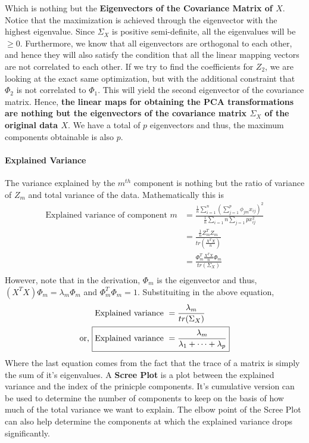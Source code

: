 \documentclass[../statistical_learning_notes.tex]{subfiles}
\begin{document}
    Which is nothing but the \textbf{Eigenvectors of the Covariance Matrix of $X$}. Notice that the maximization is achieved through the eigenvector with the highest eigenvalue. Since $\Sigma_{X}$ is positive semi-definite, all the eigenvalues will be $\geq 0$. \newline
    Furthermore, we know that all eigenvectors are orthogonal to each other, and hence they will also satisfy the condition that all the linear mapping vectors are not correlated to each other. \newline
    If we try to find the coefficients for $Z_{2}$, we are looking at the exact same optimization, but with the additional constraint that $\Phi_{2}$ is not correlated to $\Phi_{1}$. This will yield the second eigenvector of the covariance matrix. \newline
    Hence, \textbf{the linear maps for obtaining the PCA transformations are nothing but the eigenvectors of the covariance matrix $\Sigma_{X}$ of the original data $X$}. We have a total of $p$ eigenvectors and thus, the maximum components obtainable is also $p$.

    \paragraph{Explained Variance}
    The variance explained by the $m^{th}$ component is nothing but the ratio of variance of $Z_{m}$ and total variance of the data. Mathematically this is
    \begin{align*}
        \text{Explained variance of component } m &= \frac{\frac{1}{n}\sum_{i=1}^{n} (\sum_{j=1}^{p} \phi_{jm} x_{ij})^{2}}{\frac{1}{n}\sum_{i=1}{n} \sum_{j=1}{p} x_{ij}^2}\\
                &= \frac{\frac{1}{n}Z_{m}^{T}Z_{m}}{tr(\frac{X^{T}X}{n})}\\
                &= \frac{\Phi_{m}^{T}\frac{X^{T}X}{n}\Phi_{m}}{tr(\Sigma_{X})}\\
    \end{align*}
    However, note that in the derivation, $\Phi_{m}$ is the eigenvector and thus, $(X^{T}X)\Phi_{m} = \lambda_{m}\Phi_{m}$ and $\Phi_{m}^{T}\Phi_{m} = 1$. Substituiting in the above equation,
    \begin{align*}
        \text{Explained variance } &= \frac{\lambda_{m}}{tr(\Sigma_{X})}\\
        \text{or, } \Aboxed{\text{Explained variance } &= \frac{\lambda_{m}}{\lambda_{1} + \cdots +\lambda_{p}}}
    \end{align*}
    Where the last equation comes from the fact that the trace of a matrix is simply the sum of it's eigenvalues.\newline
    A \textbf{Scree Plot} is a plot between the explained variance and the index of the prinicple components. It's cumulative version can be used to determine the number of components to keep on the basis of how much of the total variance we want to explain. The elbow point of the Scree Plot can also help determine the components at which the explained variance drops significantly.
\end{document}
